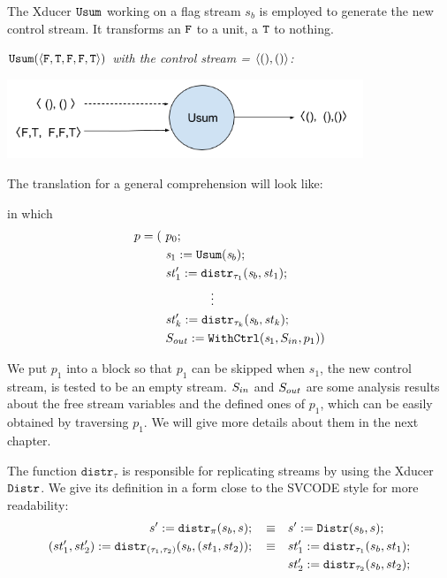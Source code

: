 The Xducer $\mathtt{Usum}$ working on a flag stream $s_b$ is employed to generate the new control stream. It transforms an $\mathtt{F}$ to a unit, a $\mathtt{T}$ to nothing.
\begin{example} \emph{$\usumf{\<\F,\T,\F,\F,\T\'>}$ with the control stream = $\<(),() \'>$:} \\
	\begin{center}
		\includegraphics[width=0.8\textwidth]{fig/usumxducer.png}
	\end{center}
\end{example}

The translation for a general comprehension will look like:\\[3ex]

\def\Distr#1#2#3{\mathtt{distr}_{#3}(#1,#2)}
\def\Pack#1#2#3{\mathtt{pack}_{#3}(#1,#2)}

in which $$ \begin{aligned}
p = ( & \ p_0; \\
    & \ \sdef{\s_1}{\usum(\s_b)}; \\
	& \ \sdef{\st_1'}{\Distr{\s_b}{\st_1}{\tau_1}}; \\
	& \qquad \qquad \vdots \\
	& \ \sdef{\st_k'}{\Distr{\s_b}{\st_k}{\tau_k}}; \\
	& \ \withctrl{\s_1}{p_1}{\Sin}{\Sout} ) \\
\end{aligned}$$	

We put $p_1$ into a \wc block so that $p_1$ can be skipped when $s_1$, the new control stream, is tested to be an empty stream.
$S_{in}$ and $S_{out}$  are some analysis results about the free stream variables and the defined ones of $p_1$, which can be easily obtained by traversing $p_1$. We will give more details about them in the next chapter.

The function $\mathtt{distr}_{\tau}$ is responsible for replicating streams by using the Xducer $\mathtt{Distr}$. 
We give its definition in a form close to the SVCODE style for more readability:
\begin{align*}
	s' := \Distr{s_b}{s}{\pi}; \quad \equiv & \quad s' := \distrf{s_b}{s}; \\
	(st'_1,st'_2)  := \Distr{s_b}{(st_1,st_2)}{(\tau_1,\tau_2)}; \quad \equiv & \quad st_1' := \Distr{s_b}{st_1}{\tau_1}; \\ 
	&\quad st_2' := \Distr{s_b}{st_2}{\tau_2};
\end{align*}

